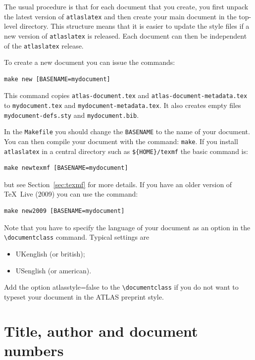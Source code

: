 \documentclass[UKenglish]{latex/atlasdoc}
\newcommand{\File}[1]{\texttt{#1}\xspace}
\newcommand{\Macro}[1]{\texttt{\textbackslash #1}\xspace}
\newcommand{\Option}[1]{\textsf{#1}\xspace}
\newcommand{\Package}[1]{\texttt{#1}\xspace}
\begin{document}
The usual procedure is that for each document that you create,
you first unpack the latest version of \Package{atlaslatex} and
then create your main document in the top-level directory.
This structure means that it is easier to update the style files if a new version of
\Package{atlaslatex} is released. 
Each document can then be independent of the \Package{atlaslatex} release.

To create a new document you can issue the commands:
%
\begin{verbatim}
make new [BASENAME=mydocument]
\end{verbatim}
%
This command copies \File{atlas-document.tex} and
\File{atlas-document-metadata.tex}
to \File{mydocument.tex} and \File{mydocument-metadata.tex}.
It also creates empty files \File{mydocument-defs.sty} and \File{mydocument.bib}.

In the \File{Makefile} you should change the \texttt{BASENAME} to the name of your document.
You can then compile your document with the command: \texttt{make}.
If you install \Package{atlaslatex} in a central directory such as \File{\$\{HOME\}/texmf} the basic command is:
%
\begin{verbatim}
make newtexmf [BASENAME=mydocument]
\end{verbatim}
%
but see Section~\ref{sec:texmf} for more details.
If you have an older version of \TeX\ Live (2009) you can use the command:
%
\begin{verbatim}
make new2009 [BASENAME=mydocument]
\end{verbatim}

Note that you have to specify the language of your document as an option in the
\Macro{documentclass} command. Typical settings are
\begin{itemize}
\item UKenglish (or british);
\item USenglish (or american).
\end{itemize}

Add the option \Option{atlasstyle=false} to the \Macro{documentclass} if you do not want to typeset your document in the ATLAS preprint style.


\section{Title, author and document numbers}
\label{sec:metadata}
\end{document}
